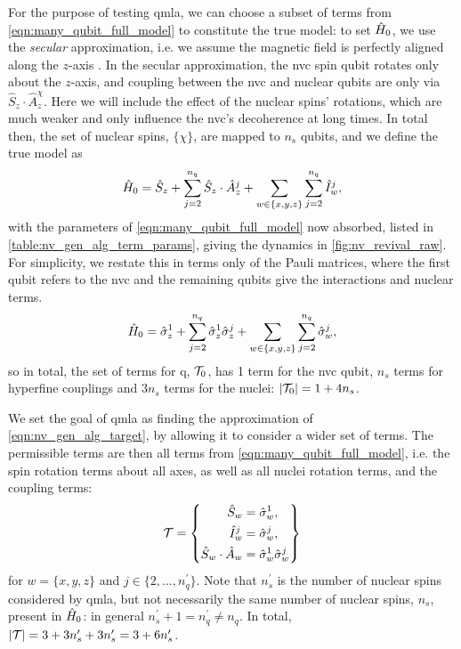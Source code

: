 For the purpose of testing \gls{qmla}, we can choose a subset of terms from \cref{eqn:many_qubit_full_model} to 
    constitute the \gls{true model}: to set $\hat{H}_0$, we use the \emph{secular} approximation, 
    i.e. we assume the magnetic field is perfectly aligned along the $z$-axis \cite{dutt2007quantum, rowan1965electron}.
In the secular approximation, the \gls{nvc} spin qubit rotates only about the $z$-axis, 
    and coupling between the \gls{nvc} and nuclear qubits are only via $\hat{S}_z \cdot \hat{A}_z^{\chi}$.
Here we will include the effect of the nuclear spins' rotations, which are much weaker and only influence the \gls{nvc}'s decoherence at long times. 
In total then, the set of nuclear spins, $\{\chi\}$, are mapped to $n_s$ qubits, 
    and we define the \gls{true model} as 
\begin{equation}
    \hat{H}_0 = \hat{S}_z 
    + \sum\limits_{ j=2 }^{n_q} \hat{S}_z \cdot \hat{A}_z^{j} 
    + \sum\limits_{w \in \{x,y,z\}} \sum\limits_{ j=2 }^{n_q} \hat{I}_w^{j},
\end{equation}
    with the parameters of \cref{eqn:many_qubit_full_model} now absorbed, listed in \cref{table:nv_gen_alg_term_params}, 
    giving the dynamics in \cref{fig:nv_revival_raw}.
For simplicity, we restate this in terms only of the Pauli matrices,
    where the first qubit refers to the \gls{nvc} and the remaining qubits give the interactions and nuclear terms.
\begin{equation}
    \label{eqn:nv_gen_alg_target}
    \hat{H}_0 = \hat{\sigma}_{z}^1 
    + \sum\limits_{ j=2 }^{n_q} \hat{\sigma}_{z}^1 \hat{\sigma}_{z}^j 
    + \sum\limits_{w \in \{x,y,z\}} \sum\limits_{ j=2 }^{n_q} \hat{\sigma}_w^j,
\end{equation}
    so in total, the set of terms for \gls{q}, $\mathcal{T}_0$, has 1 term for the \gls{nvc} qubit, $n_s$ terms for hyperfine couplings
    and $3n_s$ terms for the nuclei: $\left\lvert \mathcal{T}_0 \right\rvert = 1 + 4n_s$.
\par 

We set the goal of \gls{qmla} as finding the approximation of \cref{eqn:nv_gen_alg_target},
    by allowing it to consider a wider set of terms. 
The permissible terms are then all terms from \cref{eqn:many_qubit_full_model}, 
    i.e. the spin rotation terms about all axes, 
    as well as all nuclei rotation terms, and the coupling terms:
\begin{equation}
    \mathcal{T} = \left\{ 
        \begin{split}    
            \hat{S}_w &= \hat{\sigma}_w^{1}, \\
            \hat{I}_w^{j} &= \hat{\sigma}_w^{j}, \\
            \hat{S}_w \cdot \hat{A}_w &= \hat{\sigma}_w^1 \hat{\sigma}_w^j
        \end{split}
    \right\}
    \label{eqn:nv_ga_terms}
\end{equation}
    for $w=\{ x, y, z \}$ and $j \in \{ 2, ..., n_q^{\prime} \}$.
Note that $n_s^{\prime}$ is the number of nuclear spins considered by \gls{qmla}, but not necessarily the 
    same number of nuclear spins, $n_s$, present in $\hat{H}_0$:
    in general $n_s^{\prime}+1 = n_q^{\prime} \neq n_q$.
In total, $\left\lvert \mathcal{T} \right\rvert = 3 + 3n_s^{\prime} + 3 n_s^{\prime} = 3 + 6 n_s^{\prime}$. 

